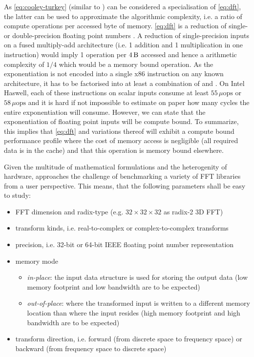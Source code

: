 As \cref{eq:cooley-turkey} (similar to \cite{bluestein,stockham1966high}) can be considered a specialisation of \cref{eq:dft}, the latter can be used to approximate the algorithmic complexity, i.e. a ratio of compute operations per accessed byte of memory. \cref{eq:dft} is a reduction of single- or double-precision floating point numbers \cite{ieee2008754}. A reduction of single-precision inputs on a fused multiply-add architecture (i.e. 1 addition and 1 multiplication in one instruction) would imply 1 operation per $\SI{4}{\byte}$ accessed and hence a arithmetic complexity of $1/4$ which would be a memory bound operation. As the exponentiation is not encoded into a single x86 instruction on any known architecture, it has to be factorised into at least a combination of  and . On Intel Haswell, each of these instructions on scalar inputs consume at least $55\,\mu\text{ops}$ or $58\,\mu\text{ops}$ \cite{agnerfog} and it is hard if not impossible to estimate on paper how many cycles the entire exponentiation will consume. However, we can state that the exponentiation of floating point inputs will be compute bound. To summarize, this implies that \cref{eq:dft} and variations thereof will exhibit a compute bound performance profile where the cost of memory access is negligible (all required data is in the cache) and that this operation is memory bound elsewhere.   

Given the multitude of mathematical formulations and the heterogenity of hardware, \gearshifft{} approaches the challenge of benchmarking a variety of FFT libraries from a user perspective. This means, that the following parameters shall be easy to study:

\begin{itemize}
\item FFT dimension and radix-type (e.g. $32{\times}32{\times}32$ as radix-2 3D FFT)
\item transform kinds, i.e. real-to-complex or complex-to-complex transforms
\item precision, i.e. 32-bit or 64-bit IEEE floating point number representation
\item memory mode
  \begin{itemize}
  \item \emph{in-place}: the input data structure is used for storing the output data (low memory footprint and low bandwidth are to be expected)
  \item \emph{out-of-place}:  where the transformed input is written to a different memory location than where the input resides (high memory footprint and high bandwidth are to be expected)
  \end{itemize}
\item transform direction, i.e. forward (from discrete space to frequency space) or backward (from frequency space to discrete space)
\end{itemize}
 
